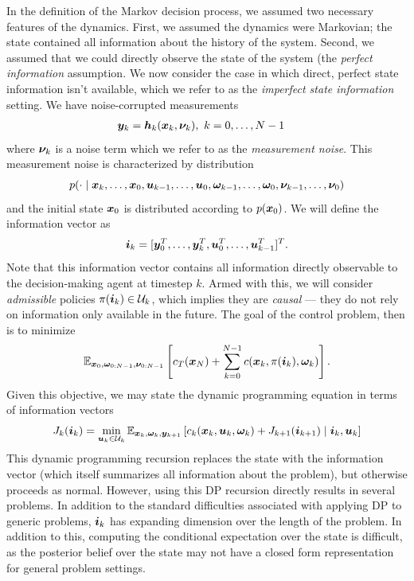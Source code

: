 In the definition of the Markov decision process, we assumed two necessary features of the dynamics. First, we assumed the dynamics were Markovian; the state contained all information about the history of the system. Second, we assumed that we could directly observe the state of the system (the \textit{perfect information} assumption. 
We now consider the case in which direct, perfect state information isn't available, which we refer to as the \textit{imperfect state information} setting. We have noise-corrupted measurements
\begin{align}
    \bm{y}_{k} &= \bm{h}_k(\bm{x}_k, \bm{\nu}_{k}), \,\, k=0,\ldots,N-1
\end{align}
where $\bm{\nu}_k$ is a noise term which we refer to as the \textit{measurement noise}. This measurement noise is characterized by distribution 
\begin{equation}
    p(\cdot\mid \bm{x}_k,\ldots,\bm{x}_0,\bm{u}_{k-1},\ldots,\bm{u}_0,\bm{\omega}_{k-1},\ldots,\bm{\omega}_{0},\bm{\nu}_{k-1},\ldots,\bm{\nu}_{0})
\end{equation}
and the initial state $\bm{x}_0$ is distributed according to $p(\bm{x}_0)$. We will define the information vector as
\begin{equation}
    \bm{i}_k = [\bm{y}_0^T, \ldots, \bm{y}_k^T, \bm{u}_0^T, \ldots, \bm{u}_{k-1}^T]^T.
\end{equation}
Note that this information vector contains all information directly observable to the decision-making agent at timestep $k$. Armed with this, we will consider \textit{admissible} policies $\pi(\bm{i}_k) \in \mathcal{U}_k$, which implies they are \textit{causal} --- they do not rely on information only available in the future. The goal of the control problem, then is to minimize 
\begin{equation}
    \mathbb{E}_{\bm{x}_{0},\bm{\omega}_{0:N-1},\bm{\nu}_{0:N-1}} \left[ c_T(\bm{x}_N) + \sum_{k=0}^{N-1} c(\bm{x}_k, \pi(\bm{i}_k),\bm{\omega}_{k}) \right].
\end{equation}
Given this objective, we may state the dynamic programming equation in terms of information vectors
\begin{equation}
    J_k(\bm{i}_k) = \min_{\bm{u}_k \in \mathcal{U}_k} \mathbb{E}_{\bm{x}_k, \bm{\omega}_k, \bm{y}_{k+1}} \left[ c_k(\bm{x}_k,\bm{u}_k,\bm{\omega}_k) + J_{k+1}(\bm{i}_{k+1}) \mid \bm{i}_k, \bm{u}_k \right]
\end{equation}
This dynamic programming recursion replaces the state with the information vector (which itself summarizes all information about the problem), but otherwise proceeds as normal. However, using this DP recursion directly results in several problems. In addition to the standard difficulties associated with applying DP to generic problems, $\bm{i}_k$ has expanding dimension over the length of the problem.
In addition to this, computing the conditional expectation over the state is difficult, as the posterior belief over the state may not have a closed form representation for general problem settings.

